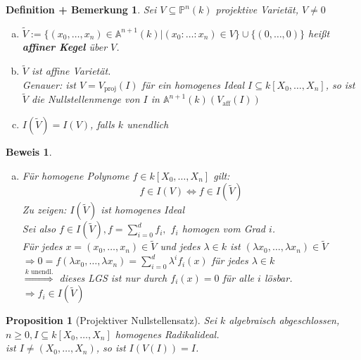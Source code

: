 \documentclass[a4paper,12pt]{report}
\theoremstyle{break}
\newtheorem{DefBem}[Def]{Definition + Bemerkung}
\newtheorem{Prop}[Def]{Proposition}
\theoremstyle{nonumberbreak}
\newtheorem{Bew}{Beweis}
\theoremstyle{nonumberplain}
\newcommand{\emp}[1]{\textbf{\emph{#1}}}
\newcommand{\begriff}[1]{{\index{#1}}\emp{#1}}
\newcommand{\Sum}{\sum\limits}
\newcommand{\A}{\mathbb{A}}
\newcommand{\IP}{\mathbb{P}}%
\begin{document}
\begin{DefBem}\label{bem10.7}
Sei $V\subseteq \IP^n(k)$ projektive Variet\"at, $V\ne0$
\begin{enumerate}[a)]
\item
	$\widetilde V:=\{(x_0,\ldots ,x_n)\in \A^{n+1}(k)|(x_0:\ldots :x_n)\in V\}\cup\{(0,\ldots ,0)\}$ hei\ss t \begriff{affiner Kegel} \"uber $V$.

\item
	$\widetilde V$ ist affine Variet\"at.\\
	Genauer: ist $V=V_{\text{proj}}(I)$ f\"ur ein homogenes Ideal $I\subseteq k[X_0,\ldots ,X_n]$, so ist $\widetilde V$ die Nullstellenmenge von $I$ in $\A^{n+1}(k)(V_{\text{aff}}(I))$
\item\label{bem10.7c}
	$I(\widetilde V)=I(V)$, falls $k$ unendlich
\end{enumerate}\end{DefBem}

\begin{Bew}\begin{enumerate}[a)]\item[c)]
F\"ur homogene Polynome $f\in k[X_0,\ldots ,X_n]$ gilt:
	\[f\in I(V) \Leftrightarrow f\in I(\widetilde V)\]
\emph{Zu zeigen:} $I(\widetilde V)$ ist homogenes Ideal\\
Sei also $f\in I(\widetilde V), f=\Sum_{i=0}^d f_i,$ $f_i$ homogen vom Grad $i$.\\
F\"ur jedes $x=(x_0,\ldots ,x_n) \in \widetilde V$ und jedes $\lambda\in k$ ist $(\lambda x_0,\ldots ,\lambda x_n)\in \widetilde V$\\
$\Rightarrow 0=f(\lambda x_0,\ldots ,\lambda x_n)= \Sum_{i=0}^d\lambda^if_i(x)$ f\"ur jedes $\lambda\in k$\\
$\overset{k\text{ unendl.}}{\Longrightarrow} $ dieses LGS ist nur durch $f_i(x)=0$ f\"ur alle $i$ l\"osbar.\\
$\Rightarrow f_i\in I(\widetilde V)$
\end{enumerate}\end{Bew}

\begin{Prop}[Projektiver Nullstellensatz]
Sei $k$ algebraisch abgeschlossen, $n\ge0, I\subseteq k[X_0,\ldots ,X_n]$ homogenes Radikalideal.\\
ist $I\not=(X_0,\ldots ,X_n)$, so ist $I(V(I))=I$.
\end{Prop}
\end{document}
